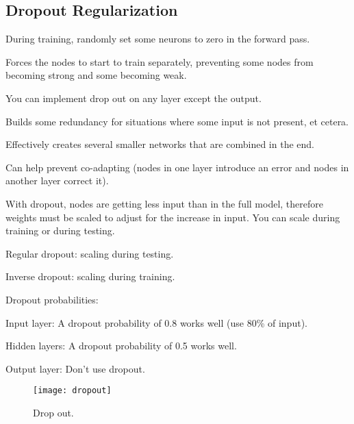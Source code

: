 	\subsection{Dropout Regularization}
	\begin{bulletedlist}
		\item During training, randomly set some neurons to zero in the forward pass.
		\item Forces the nodes to start to train separately, preventing some nodes from becoming strong and some becoming weak.
		\item You can implement drop out on any layer except the output.
		\item Builds some redundancy for situations where some input is not present, et cetera.
		\item Effectively creates several smaller networks that are combined in the end.
		\item Can help prevent co-adapting (nodes in one layer introduce an error and nodes in another layer correct it).
		\item With dropout, nodes are getting less input than in the full model, therefore weights must be scaled to adjust for the increase in input.  You can scale during training or during testing.
		\begin{bulletedlist}
			\item Regular dropout: scaling during testing.
			\item Inverse dropout: scaling during training.
		\end{bulletedlist}
		\item Dropout probabilities:
		\begin{bulletedlist}
			\item Input layer: A dropout probability of 0.8 works well (use 80\% of input).
			\item Hidden layers: A dropout probability of 0.5 works well.
			\item Output layer: Don't use dropout.
		\end{bulletedlist}
	\end{bulletedlist}

 	\begin{figure}[h]
		\centering
		\texttt{[image: dropout]}
		\caption{Drop out.}
		\label{fig:dropout}
	\end{figure}

